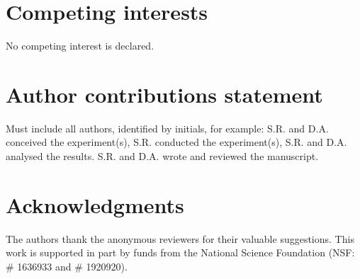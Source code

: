 \begin{appendices}
\end{appendices}

\section{Competing interests}
No competing interest is declared.

\section{Author contributions statement}

Must include all authors, identified by initials, for example:
S.R. and D.A. conceived the experiment(s),  S.R. conducted the experiment(s), S.R. and D.A. analysed the results.  S.R. and D.A. wrote and reviewed the manuscript.

\section{Acknowledgments}
The authors thank the anonymous reviewers for their valuable suggestions. This work is supported in part by funds from the National Science Foundation (NSF: \# 1636933 and \# 1920920).


% 







